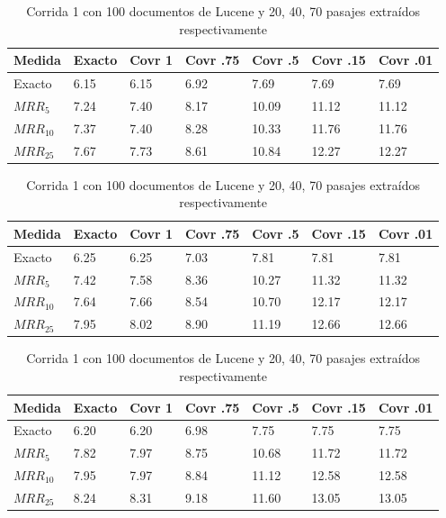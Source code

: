 \begin{table}
\centering
\begin{center}
\begin{tabular}{|l | l | l | l | l | l | l |}
\hline
Medida & Exacto & Covr 1 & Covr .75 & Covr .5 & Covr .15 & Covr .01 \\ \hline
Exacto & 6.15 & 6.15 & 6.92 & 7.69 & 7.69 & 7.69  \\ \hline
$MRR_{5}$ & 7.24 & 7.40 & 8.17 & 10.09 & 11.12 & 11.12  \\ \hline
$MRR_{10}$ & 7.37 & 7.40 & 8.28 & 10.33 & 11.76 & 11.76  \\ \hline
$MRR_{25}$ & 7.67 & 7.73 & 8.61 & 10.84 & 12.27 & 12.27  \\ \hline
\end{tabular}

\medskip

\begin{tabular}{|l | l | l | l | l | l | l |}
\hline
Medida & Exacto & Covr 1 & Covr .75 & Covr .5 & Covr .15 & Covr .01 \\ \hline
Exacto & 6.25 & 6.25 & 7.03 & 7.81 & 7.81 & 7.81  \\ \hline
$MRR_{5}$ & 7.42 & 7.58 & 8.36 & 10.27 & 11.32 & 11.32  \\ \hline
$MRR_{10}$ & 7.64 & 7.66 & 8.54 & 10.70 & 12.17 & 12.17  \\ \hline
$MRR_{25}$ & 7.95 & 8.02 & 8.90 & 11.19 & 12.66 & 12.66  \\ \hline
\end{tabular}

\medskip

\begin{tabular}{|l | l | l | l | l | l | l |}
\hline
Medida & Exacto & Covr 1 & Covr .75 & Covr .5 & Covr .15 & Covr .01 \\ \hline
Exacto & 6.20 & 6.20 & 6.98 & 7.75 & 7.75 & 7.75  \\ \hline
$MRR_{5}$ & 7.82 & 7.97 & 8.75 & 10.68 & 11.72 & 11.72  \\ \hline
$MRR_{10}$ & 7.95 & 7.97 & 8.84 & 11.12 & 12.58 & 12.58  \\ \hline
$MRR_{25}$ & 8.24 & 8.31 & 9.18 & 11.60 & 13.05 & 13.05  \\ \hline
\end{tabular}

\caption{Corrida 1 con 100 documentos de Lucene y 20, 40, 70 pasajes extraídos respectivamente}
\label{table:1_100_getExactMRRWikiFactoid_getCovrMRRWikiFactoid}
\end{center}
\end{table}


